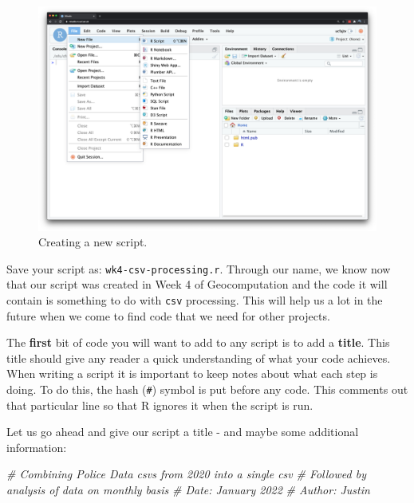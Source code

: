 \documentclass[
]{book}
\newenvironment{Shaded}{\begin{snugshade}}{\end{snugshade}}
\newcommand{\CommentTok}[1]{\textcolor[rgb]{0.56,0.35,0.01}{\textit{#1}}}
\begin{document}
\begin{figure}

{\centering \includegraphics[width=30.26in]{images/w04/new-script} 

}

\caption{Creating a new script.}\label{fig:04-rstudio-interface-script-open}
\end{figure}

Save your script as: \texttt{wk4-csv-processing.r}. Through our name, we know now that our script was created in Week 4 of Geocomputation and the code it will contain is something to do with \texttt{csv} processing. This will help us a lot in the future when we come to find code that we need for other projects.

The \textbf{first} bit of code you will want to add to any script is to add a \textbf{title}. This title should give any reader a quick understanding of what your code achieves. When writing a script it is important to keep notes about what each step is doing. To do this, the hash (\texttt{\#}) symbol is put before any code. This comments out that particular line so that R ignores it when the script is run.

Let us go ahead and give our script a title - and maybe some additional information:

\begin{Shaded}
\begin{Highlighting}[]
\CommentTok{\# Combining Police Data csv\textquotesingle{}s from 2020 into a single csv}
\CommentTok{\# Followed by analysis of data on monthly basis}
\CommentTok{\# Date: January 2022}
\CommentTok{\# Author: Justin }
\end{Highlighting}
\end{Shaded}
\end{document}
